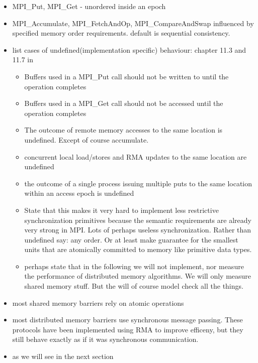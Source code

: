 \documentclass[a4paper, 10pt]{article}
\begin{document}
\begin{enumerate}
\begin{itemize}
\begin{itemize}
			\item MPI\_Put, MPI\_Get - unordered inside an epoch
			\item MPI\_Accumulate, MPI\_FetchAndOp, MPI\_CompareAndSwap influenced by specified memory order requirements. default is sequential consistency.
			\item list cases of undefined(implementation specific) behaviour: chapter 11.3 and 11.7 in \cite{mpi3}
				\begin{itemize}
					\item Buffers used in a MPI\_Put call should not be written to until the operation completes
					\item Buffers used in a MPI\_Get call should not be accessed until the operation completes
					\item The outcome of remote memory accesses to the same location is undefined. Except of course accumulate.
					\item concurrent local load/stores and RMA updates to the same location are undefined
					\item the outcome of a single process issuing multiple puts to the same location within an access epoch is undefined
					\item State that this makes it very hard to implement less restrictive synchronization primitives because the semantic requirements are already very strong in MPI. Lots of perhaps useless synchronization. Rather than undefined say: any order. Or at least make guarantee for the smallest units that are atomically committed to memory like primitive data types.
					\item perhaps state that in the following we will not implement, nor measure the performance of distributed memory algorithms. We will only measure shared memory stuff. But the will of course model check all the things.
				\end{itemize}
		\end{itemize}
\end{itemize}

\begin{itemize}
	\item most shared memory barriers rely on atomic operations
	\item most distributed memory barriers use synchronous message passing. These protocols have been implemented using RMA to improve efficeny, but they still behave exactly as if it was synchronous communication.
	\item as we will see in the next section
\end{itemize}


\end{enumerate}
\end{document}
